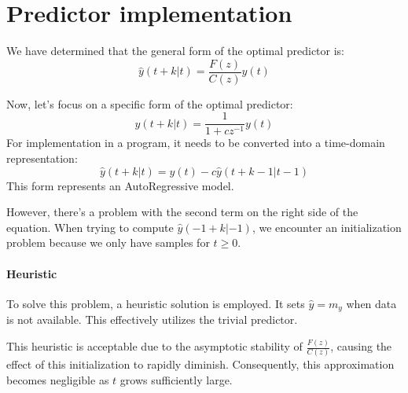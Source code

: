 \section{Predictor implementation}

We have determined that the general form of the optimal predictor is:
\[\hat{y}(t+k|t)=\dfrac{F(z)}{C(z)}y(t)\]

Now, let's focus on a specific form of the optimal predictor:
\[\hat{y}(t+k|t)=\dfrac{1}{1+cz^{-1}}y(t)\]
For implementation in a program, it needs to be converted into a time-domain representation:
\[\hat{y}(t+k|t)=y(t)-c\hat{y}(t+k-1|t-1) \]
This form represents an AutoRegressive model.

However, there's a problem with the second term on the right side of the equation.
When trying to compute $\hat{y}(-1+k|-1)$, we encounter an initialization problem because we only have samples for $t\geq 0$.

\paragraph*{Heuristic}
To solve this problem, a heuristic solution is employed. 
It sets $\hat{y}=m_y$ when data is not available. 
This effectively utilizes the trivial predictor.

This heuristic is acceptable due to the asymptotic stability of $\frac{F(z)}{C(z)}$, causing the effect of this initialization to rapidly diminish. 
Consequently, this approximation becomes negligible as $t$ grows sufficiently large.